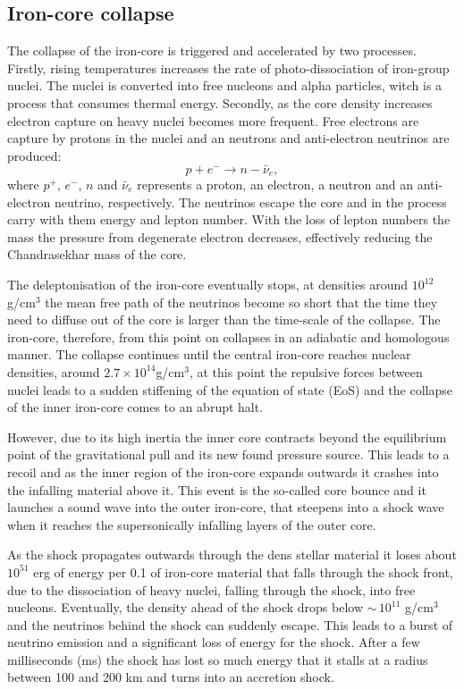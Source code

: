 \subsection{Iron-core collapse}
The collapse of the iron-core is triggered and accelerated by two processes.
Firstly, rising temperatures increases the rate of photo-dissociation of iron-group 
nuclei. The nuclei is converted into free nucleons and alpha particles,
witch is a process that consumes thermal energy. Secondly, as the core density increases electron capture
on heavy nuclei becomes more frequent. Free electrons are capture by protons in the nuclei and an neutrons 
and anti-electron neutrinos are produced:
\begin{equation} \label{eqSN:ecapture}
p + e^{-} \rightarrow n - \bar{\nu}_e,
\end{equation}
where $p^{+}$, $e^{-}$, $n$ and $\bar{\nu}_e$ represents a proton, an electron, 
a neutron and an anti-electron neutrino, respectively.
The neutrinos escape the core and in the process carry with them energy
and lepton number. With the loss of lepton numbers the mass the pressure from
degenerate electron decreases, effectively reducing the Chandrasekhar mass of the core. 

The deleptonisation of the iron-core eventually stops, at densities around $10^{12}$ g/cm$^3$ the
mean free path of the neutrinos become so short that the time they need to diffuse out of the
core is larger than the time-scale of the collapse. The iron-core, therefore, from this point on collapses in an 
adiabatic and homologous manner. The collapse continues until the central iron-core reaches nuclear densities, around $2.7 \times 10^{14} $g/cm$^3$,
at this point the repulsive forces between nuclei leads to a sudden stiffening of the equation of state (EoS) and the collapse of the
inner iron-core comes to an abrupt halt. 

However, due to its high inertia the inner core contracts beyond the equilibrium point of the
gravitational pull and its new found pressure source. This leads to a recoil and as the inner region of the iron-core expands outwards it crashes
into the infalling material above it. This event is the so-called core bounce and it launches a sound wave into the outer iron-core, that steepens into a shock wave when it reaches the supersonically infalling layers of the outer core.

As the shock propagates outwards through the dens stellar material it loses about 
$10^{51}$ erg of energy per 0.1 \msun of iron-core material that falls through the shock front, 
due to the dissociation of heavy nuclei, falling through the shock, into free nucleons.
Eventually, the density ahead of the shock drops below $\sim \, 10^{11}$ g/cm$^3$ and
the neutrinos behind the shock can suddenly escape. This leads to a burst of neutrino emission and a significant loss of energy for the shock. After a few milliseconds (ms) the
shock has lost so much energy that it stalls at a radius between 100 and 200 km
and turns into an accretion shock.

